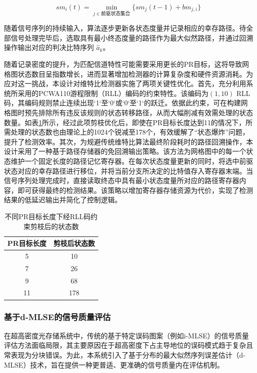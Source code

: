 \[
sm_i(t) = \min_{j \in \text{前驱状态集合}} \{ sm_j(t-1) + bm_{j,i} \}
\]

随着信号序列的持续输入，算法逐步更新各状态度量并记录相应的幸存路径。待全部信号处理完毕后，选取具有最小终态度量的路径作为最大似然路径，并通过回溯操作输出对应的判决比特序列 $\hat{a}_k$。

随着记录密度的提升，为匹配信道特性可能需要采用更长的PR目标，这将导致网格图状态数目呈指数增长，进而显著增加检测器的计算复杂度和硬件资源消耗。为应对这一挑战，本设计对维特比检测器实施了两项关键性优化。首先，充分利用系统所采用的PCWA110游程限制（RLL）编码的约束特性。该编码为$(1,10)$ RLL码，其编码规则禁止连续出现`1`至`0`或`0`至`1`的跃迁。依据此约束，可在构建网格图时预先排除所有违反该规则的状态转移路径，从而大幅削减有效需处理的状态数量。如表\ref{tab:pruned_states}所示，经过此项剪枝优化后，即使在PR目标长度达到11的情况下，所需处理的状态数也由理论上的1024个锐减至178个，有效缓解了“状态爆炸”问题，提升了检测效率。其次，为规避传统维特比算法最终阶段耗时的路径回溯操作，本设计采用了一种基于路径存储器的免回溯输出策略。该方法为网格图中的每一个状态维护一个固定长度的路径记忆寄存器。在每次状态度量更新的同时，将选中前驱状态对应的幸存路径进行移位，并将当前分支所决定的比特值存入寄存器末端。当信号序列处理完成时，直接读取终态中具有最小状态度量所对应的路径寄存器内容，即可获得最终的检测结果。该策略以增加寄存器存储资源为代价，实现了检测结果的低延迟输出并简化了控制逻辑。

\begin{table}[h]
	\centering
	\caption{不同PR目标长度下经RLL码约束剪枝后的状态数}
	\label{tab:pruned_states}
	\begin{tabular}{c|c}
		\hline
		PR目标长度 & 剪枝后状态数 \\
		\hline
		5 & 10 \\
		7 & 26 \\
		9 & 68 \\
		11 & 178 \\
		\hline
	\end{tabular}
\end{table}

\subsubsection{基于d-MLSE的信号质量评估}

在超高密度光存储系统中，传统的基于特定误码图案（例如i-MLSE）的信号质量评估方法面临局限，其主要原因在于超高密度下占主导地位的误码模式趋于复杂且常表现为分块错误。为此，本系统引入了基于分布的最大似然序列误差估计（d-MLSE）技术，旨在提供一种更普适、更准确的信号质量内在评估机制。

